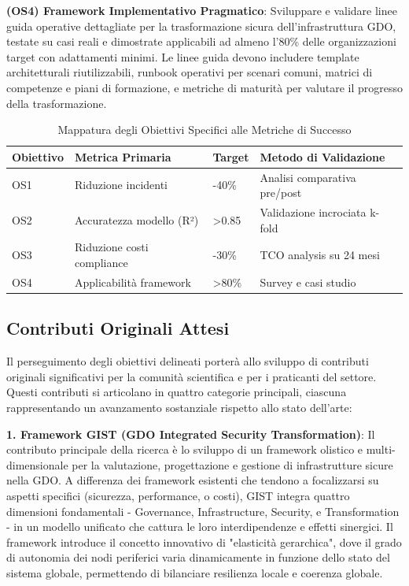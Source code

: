 \textbf{(OS4) Framework Implementativo Pragmatico}: Sviluppare e validare linee guida operative dettagliate per la trasformazione sicura dell'infrastruttura GDO, testate su casi reali e dimostrate applicabili ad almeno l'80\% delle organizzazioni target con adattamenti minimi. Le linee guida devono includere template architetturali riutilizzabili, runbook operativi per scenari comuni, matrici di competenze e piani di formazione, e metriche di maturità per valutare il progresso della trasformazione.

\begin{table}[htbp]
\centering
\caption{Mappatura degli Obiettivi Specifici alle Metriche di Successo}
\label{tab:obiettivi_metriche}
\begin{tabular}{|l|l|l|l|}
\hline
\textbf{Obiettivo} & \textbf{Metrica Primaria} & \textbf{Target} & \textbf{Metodo di Validazione} \\
\hline
OS1 & Riduzione incidenti & -40\% & Analisi comparativa pre/post \\
\hline
OS2 & Accuratezza modello (R²) & >0.85 & Validazione incrociata k-fold \\
\hline
OS3 & Riduzione costi compliance & -30\% & TCO analysis su 24 mesi \\
\hline
OS4 & Applicabilità framework & >80\% & Survey e casi studio \\
\hline
\end{tabular}
\end{table}

\subsection{Contributi Originali Attesi}

Il perseguimento degli obiettivi delineati porterà allo sviluppo di contributi originali significativi per la comunità scientifica e per i praticanti del settore. Questi contributi si articolano in quattro categorie principali, ciascuna rappresentando un avanzamento sostanziale rispetto allo stato dell'arte:

\textbf{1. Framework GIST (GDO Integrated Security Transformation)}: Il contributo principale della ricerca è lo sviluppo di un framework olistico e multi-dimensionale per la valutazione, progettazione e gestione di infrastrutture sicure nella GDO. A differenza dei framework esistenti che tendono a focalizzarsi su aspetti specifici (sicurezza, performance, o costi), GIST integra quattro dimensioni fondamentali - Governance, Infrastructure, Security, e Transformation - in un modello unificato che cattura le loro interdipendenze e effetti sinergici. Il framework introduce il concetto innovativo di "elasticità gerarchica", dove il grado di autonomia dei nodi periferici varia dinamicamente in funzione dello stato del sistema globale, permettendo di bilanciare resilienza locale e coerenza globale.

